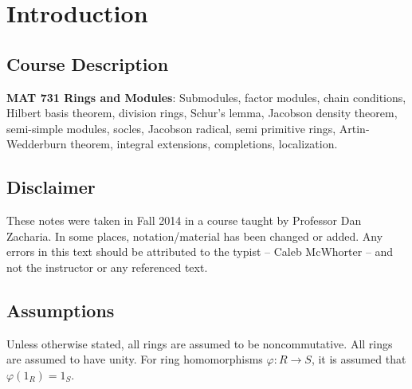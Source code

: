\newpage
\section{Introduction}

\subsection{Course Description}

\textbf{MAT 731 Rings and Modules}: Submodules, factor modules, chain conditions, Hilbert basis theorem, division rings, Schur's lemma, Jacobson density theorem, semi-simple modules, socles, Jacobson radical, semi primitive rings, Artin-Wedderburn theorem, integral extensions, completions, localization.

\subsection{Disclaimer}

These notes were taken in Fall 2014 in a course taught by Professor Dan Zacharia. In some places, notation/material has been changed or added. Any errors in this text should be attributed to the typist -- Caleb McWhorter -- and not the instructor or any referenced text. 

\subsection{Assumptions}

Unless otherwise stated, all rings are assumed to be noncommutative. All rings are assumed to have unity. For ring homomorphisms $\varphi: R \rightarrow S$, it is assumed that $\varphi(1_R)=1_S$.































